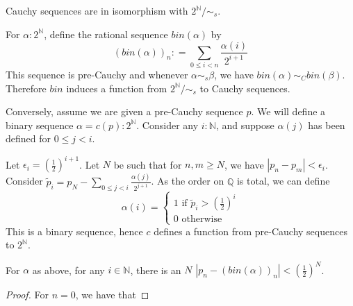 \begin{proposition}
  Cauchy sequences are in isomorphism with $2^\mathbb N / \sim_s$. 
\end{proposition} 
\begin{definition}
  For $\alpha: 2^\mathbb N$, define the rational sequence $bin(\alpha)$ by 
  \begin{equation} (bin (\alpha))_n :  = \sum\limits_{0 \leq i < n} \frac{\alpha(i)} { 2^{i+1}} \end{equation}  
  This sequence is pre-Cauchy and whenever $\alpha\sim_s \beta$, we have 
  $bin(\alpha) \sim_C bin(\beta)$. 
  Therefore $bin$ induces a function from $2^\mathbb N / \sim_s$ to Cauchy sequences. 
\end{definition}  
\begin{definition}
  Conversely, assume we are given a pre-Cauchy sequence $p$. 
  We will define a binary sequence $\alpha  = c(p): 2^\mathbb N$.
  Consider any $i:\mathbb N$, and suppose $\alpha(j)$ has been defined for $0 \leq j<i$. 

  Let $\epsilon_i = (\frac12)^{i+1}$. %
  Let $N$ be such that for $n,m \geq N$, we have $|p_n - p_m| < \epsilon_i$. 
  Consider $\widetilde p_i = p_N - \sum\limits_{0\leq j < i} \frac {\alpha(j)}{2^{j+1}}$.
  As the order on $\mathbb Q$ is total, we can define 
  \begin{equation}
    \alpha(i) = \begin{cases}
    1 \text{ if } \widetilde p_i > (\frac12)^{i} \\
    0 \text{ otherwise } 
    \end{cases} 
  \end{equation}  
  This is a binary sequence, hence $c$ defines a function from pre-Cauchy sequences to $2^\mathbb N$.
\end{definition} 
\begin{lemma}
  For $\alpha$ as above, for any $i\in \mathbb N$, there is an $N$
  $|p_n-(bin(\alpha))_n| < (\frac{1}{2})^N$. 
\end{lemma}
\begin{proof}
  For $n = 0$, we have that 
\end{proof}  




